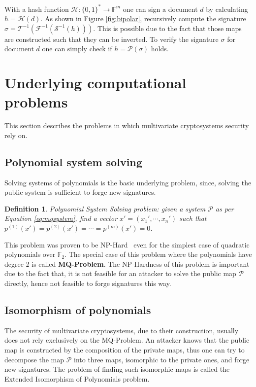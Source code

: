 \documentclass{ufsctex/ufsctex}
\newtheorem{definition}{Definition}
\begin{document}
With a hash function $\mathcal{H}:\{0,1\}^* \to \mathbb{F}^m$ one can sign a
document $d$ by calculating $h = \mathcal{H}(d)$. As shown in Figure
\ref{fig:bipolar}, recursively compute the signature $\sigma =
\mathcal{T}^{-1}(\mathcal{F}^{-1}(\mathcal{S}^{-1}(h)))$. This is possible due
to the fact that those maps are constructed such that they can be inverted. To
verify the signature $\sigma$ for document $d$ one can simply check if $h =
\mathcal{P}(\sigma)$ holds.

\section{Underlying computational problems}\label{sec:problems}

This section describes the problems in which multivariate cryptosystems
security rely on.

\subsection{Polynomial system solving}\label{sec:posso}

Solving systems of polynomials is the basic underlying problem, since, solving
the public system is sufficient to forge new signatures.

\begin{definition}
Polynomial System Solving problem: given a system $\mathcal{P}$ as per Equation
\ref{eq:mqsystem}, find a vector $x' = (x_1',\cdots,x_n')$ such that
$p^{(1)}(x') = p^{(2)}(x') = \cdots = p^{(m)}(x') = 0$.
\end{definition}

This problem was proven to be NP-Hard~\cite[Appendix A7.2]{garey1979npc} even
for the simplest case of quadratic polynomials over $\mathbb{F}_2$. The special
case of this problem where the polynomials have degree 2 is called
\textbf{MQ-Problem}. The NP-Hardness of this problem is important due to the
fact that, it is not feasible for an attacker to solve the public map
$\mathcal{P}$ directly, hence not feasible to forge signatures this way.

\subsection{Isomorphism of polynomials}

The security of multivariate cryptosystems, due to their construction, usually
does not rely exclusively on the MQ-Problem. An attacker knows that the public
map is constructed by the composition of the private maps, thus one can try to
decompose the map $\mathcal{P}$ into three maps, isomorphic to the private
ones, and forge new signatures. The problem of finding such isomorphic maps is
called the Extended Isomorphism of Polynomials problem.
\end{document}
